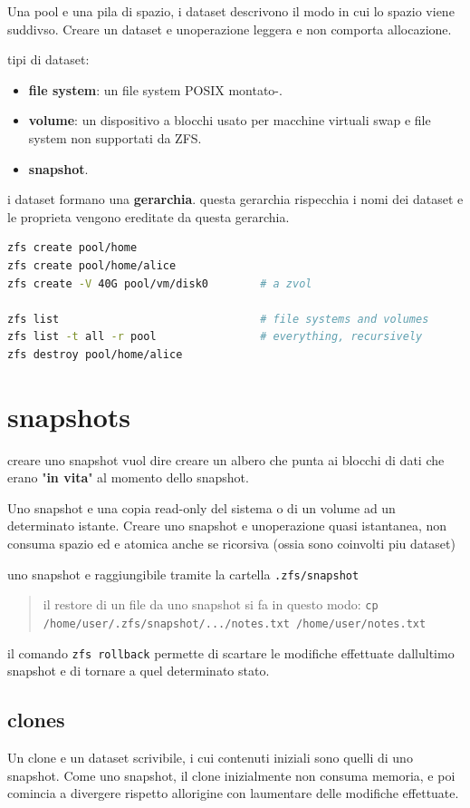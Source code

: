 Una pool e\textquotesingle{} una pila di spazio, i dataset descrivono il
modo in cui lo spazio viene suddivso. Creare un dataset
e\textquotesingle{} un\textquotesingle operazione leggera e non comporta
allocazione.

tipi di dataset:

\begin{itemize}
\tightlist
\item
  \textbf{file system}: un file system POSIX montato-.
\item
  \textbf{volume}: un dispositivo a blocchi usato per macchine virtuali
  swap e file system non supportati da ZFS.
\item
  \textbf{snapshot}.
\end{itemize}

i dataset formano una \textbf{gerarchia}. questa gerarchia rispecchia i
nomi dei dataset e le proprieta vengono ereditate da questa gerarchia.

\begin{lstlisting}[language=bash]
zfs create pool/home
zfs create pool/home/alice
zfs create -V 40G pool/vm/disk0        # a zvol

zfs list                               # file systems and volumes
zfs list -t all -r pool                # everything, recursively
zfs destroy pool/home/alice
\end{lstlisting}

\section{snapshots}\label{snapshots}

creare uno snapshot vuol dire creare un albero che punta ai blocchi di
dati che erano "\textbf{in vita}" al momento dello snapshot.

Uno snapshot e\textquotesingle{} una copia read-only del sistema o di un
volume ad un determinato istante. Creare uno snapshot
e\textquotesingle{} un\textquotesingle operazione quasi istantanea, non
consuma spazio ed e\textquotesingle{} atomica anche se ricorsiva (ossia
sono coinvolti piu dataset)

uno snapshot e\textquotesingle{} raggiungibile tramite la cartella
\passthrough{\lstinline!.zfs/snapshot!}

\begin{quote}
il restore di un file da uno snapshot si fa in questo modo:
\passthrough{\lstinline!cp /home/user/.zfs/snapshot/.../notes.txt /home/user/notes.txt!}
\end{quote}

il comando \passthrough{\lstinline!zfs rollback!} permette di scartare
le modifiche effettuate dall\textquotesingle ultimo snapshot e di
tornare a quel determinato stato.

\subsection{clones}\label{clones}

Un clone e\textquotesingle{} un dataset scrivibile, i cui contenuti
iniziali sono quelli di uno snapshot. Come uno snapshot, il clone
inizialmente non consuma memoria, e poi comincia a divergere rispetto
all\textquotesingle origine con l\textquotesingle aumentare delle
modifiche effettuate.
